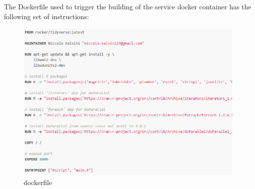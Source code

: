 \documentclass[
  12pt,
  a4paper,
  oneside]{book}
\begin{document}
The Dockerfile used to trigger the building of the service docker container has the following set of instructions:

\begin{figure}
\centering
\includegraphics{images/dockerfile.PNG}
\caption{dockerfile}
\end{figure}
\end{document}
